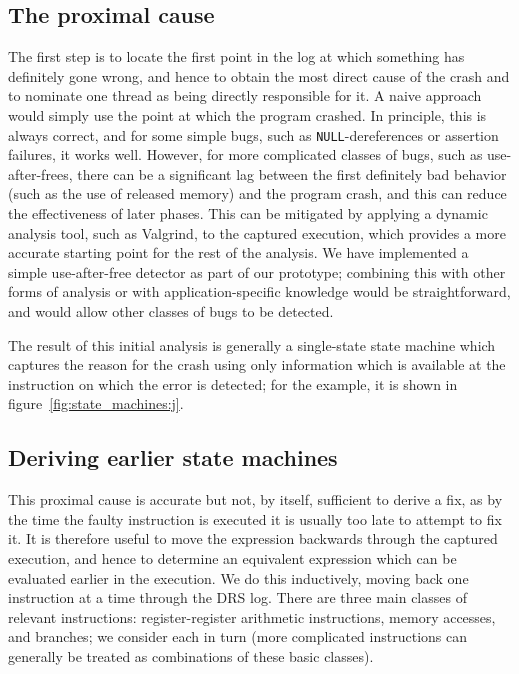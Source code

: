 \documentclass[10pt,twocolumn,preprint,natbib,authoryear]{sigplanconf}
\begin{document}
\subsection{The proximal cause}
\label{sect:prox_cause}
The first step is to locate the first point in the log at which
something has definitely gone wrong, and hence to obtain the most
direct cause of the crash and to nominate one thread as being directly
responsible for it.  A naive approach would simply use the point at
which the program crashed.  In principle, this is always correct, and
for some simple bugs, such as \verb|NULL|-dereferences or assertion
failures, it works well.  However, for more complicated classes of
bugs, such as use-after-frees, there can be a significant lag between
the first definitely bad behavior (such as the use of released memory)
and the program crash, and this can reduce the effectiveness of later
phases.  This can be mitigated by applying a dynamic analysis tool,
such as Valgrind\cite{Nethercote2007}, to the captured execution,
which provides a more accurate starting point for the rest of the
analysis.  We have implemented a simple use-after-free detector as
part of our prototype; combining this with other forms of analysis or
with application-specific knowledge would be straightforward, and
would allow other classes of bugs to be detected.

The result of this initial analysis is generally a single-state state
machine which captures the reason for the crash using only information
which is available at the instruction on which the error is detected;
for the example, it is shown in figure~\ref{fig:state_machines:j}.

\subsection{Deriving earlier state machines}
This proximal cause is accurate but not, by itself, sufficient to
derive a fix, as by the time the faulty instruction is executed it is
usually too late to attempt to fix it.  It is therefore useful to move
the expression backwards through the captured execution, and hence to
determine an equivalent expression which can be evaluated earlier in
the execution.  We do this inductively, moving back one instruction at
a time through the DRS log.  There are three main classes of relevant
instructions: register-register arithmetic instructions, memory
accesses, and branches; we consider each in turn (more complicated
instructions can generally be treated as combinations of these basic
classes).
\end{document}
